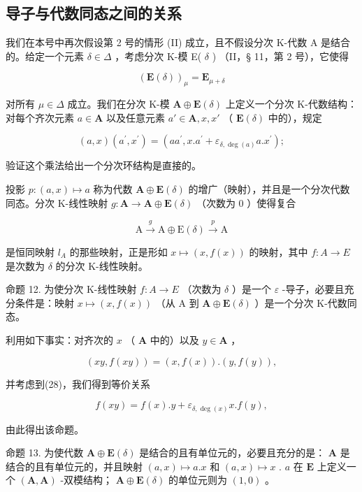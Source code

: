 \subsection{导子与代数同态之间的关系}

我们在本号中再次假设第 2 号的情形 (II) 成立，且不假设分次 K-代数 A 是结合的。给定一个元素 \(\delta \in \Delta\) ，考虑分次 K-模 E( \(\delta\) ) （II，§ 11，第 2 号），它使得

\[
(\mathbf {E} (\delta)) _ {\mu} = \mathbf {E} _ {\mu + \delta}
\]

对所有 \(\mu \in \Delta\) 成立。我们在分次 K-模 \(\mathbf{A} \oplus \mathbf{E}(\delta)\) 上定义一个分次 K-代数结构：对每个齐次元素 \(a \in \mathbf{A}\) 以及任意元素 \(a' \in \mathbf{A}, x, x'\) （ \(\mathbf{E}(\delta)\) 中的），规定

\[
(a, x) \left(a ^ {\prime}, x ^ {\prime}\right) = \left(a a ^ {\prime}, x. a ^ {\prime} + \varepsilon_ {\delta, \deg (a)} a. x ^ {\prime}\right);\tag{28}
\]

验证这个乘法给出一个分次环结构是直接的。

投影 \(p:(a,x)\mapsto a\) 称为代数 \(\mathbf{A}\oplus\mathbf{E}(\delta)\) 的增广（映射），并且是一个分次代数同态。分次 K-线性映射 \(g:\mathbf{A}\to\mathbf{A}\oplus\mathbf{E}(\delta)\) （次数为 0 ）使得复合

\[
\mathrm{A} \xrightarrow {g} \mathrm{A} \oplus \mathrm{E} (\delta) \xrightarrow {p} \mathrm{A}
\]

是恒同映射 \(l_{A}\) 的那些映射，正是形如 \(x \mapsto (x, f(x))\) 的映射，其中 \(f: A \to E\) 是次数为 \(\delta\) 的分次 K-线性映射。

命题 12. 为使分次 K-线性映射 \(f:A\to E\) （次数为 \(\delta\) ）是一个 \(\varepsilon\) -导子，必要且充分条件是：映射 \(x\mapsto(x,f(x))\) （从 A 到 \(\mathbf{A}\oplus\mathbf{E}(\delta)\) ）是一个分次 K-代数同态。

利用如下事实：对齐次的 \(x\) （ \(\mathbf{A}\) 中的）以及 \(y \in \mathbf{A}\) ，

\[
(x y, f (x y)) = (x, f (x)). (y, f (y)),
\]

并考虑到(28)，我们得到等价关系

\[
f (x y) = f (x). y + \varepsilon_ {\delta , \deg (x)} x. f (y),
\]

由此得出该命题。

命题 13. 为使代数 \(\mathbf{A} \oplus \mathbf{E}(\delta)\) 是结合的且有单位元的，必要且充分的是： \(\mathbf{A}\) 是结合的且有单位元的，并且映射 \((a, x) \mapsto a.x\) 和 \((a, x) \mapsto x\) . \(a\) 在 \(\mathbf{E}\) 上定义一个 \((\mathbf{A}, \mathbf{A})\) -双模结构； \(\mathbf{A} \oplus \mathbf{E}(\delta)\) 的单位元则为 \((1, 0)\) 。

